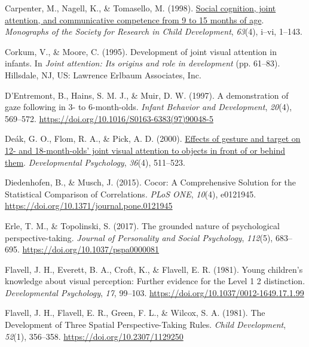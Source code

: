 \documentclass[
  man,mask,floatsintext]{apa6}
\newlength{\cslhangindent}
\newlength{\cslentryspacingunit} %
\newenvironment{CSLReferences}[2] %
 {%
  \setlength{\parindent}{0pt}
  \ifodd #1
  \let\oldpar\par
  \def\par{\hangindent=\cslhangindent\oldpar}
  \fi
  \setlength{\parskip}{#2\cslentryspacingunit}
 }%
 {}
\begin{document}
\begin{CSLReferences}{1}{0}
\leavevmode{}%
Carpenter, M., Nagell, K., \& Tomasello, M. (1998). \href{https://www.ncbi.nlm.nih.gov/pubmed/9835078}{Social cognition, joint attention, and communicative competence from 9 to 15 months of age}. \emph{Monographs of the Society for Research in Child Development}, \emph{63}(4), i--vi, 1--143.

\leavevmode{}%
Corkum, V., \& Moore, C. (1995). Development of joint visual attention in infants. In \emph{Joint attention: {Its} origins and role in development} (pp. 61--83). {Hillsdale, NJ, US}: {Lawrence Erlbaum Associates, Inc}.

\leavevmode{}%
D'Entremont, B., Hains, S. M. J., \& Muir, D. W. (1997). A demonstration of gaze following in 3- to 6-month-olds. \emph{Infant Behavior and Development}, \emph{20}(4), 569--572. \url{https://doi.org/10.1016/S0163-6383(97)90048-5}

\leavevmode{}%
Deák, G. O., Flom, R. A., \& Pick, A. D. (2000). \href{https://www.ncbi.nlm.nih.gov/pubmed/10902702}{Effects of gesture and target on 12- and 18-month-olds' joint visual attention to objects in front of or behind them}. \emph{Developmental Psychology}, \emph{36}(4), 511--523.

\leavevmode{}%
Diedenhofen, B., \& Musch, J. (2015). Cocor: {A Comprehensive Solution} for the {Statistical Comparison} of {Correlations}. \emph{PLoS ONE}, \emph{10}(4), e0121945. \url{https://doi.org/10.1371/journal.pone.0121945}

\leavevmode{}%
Erle, T. M., \& Topolinski, S. (2017). The grounded nature of psychological perspective-taking. \emph{Journal of Personality and Social Psychology}, \emph{112}(5), 683--695. \url{https://doi.org/10.1037/pspa0000081}

\leavevmode{}%
Flavell, J. H., Everett, B. A., Croft, K., \& Flavell, E. R. (1981). Young children's knowledge about visual perception: {Further} evidence for the {Level} 1 2 distinction. \emph{Developmental Psychology}, \emph{17}, 99--103. \url{https://doi.org/10.1037/0012-1649.17.1.99}

\leavevmode{}%
Flavell, J. H., Flavell, E. R., Green, F. L., \& Wilcox, S. A. (1981). The {Development} of {Three Spatial Perspective-Taking Rules}. \emph{Child Development}, \emph{52}(1), 356--358. \url{https://doi.org/10.2307/1129250}


\end{CSLReferences}
\end{document}
